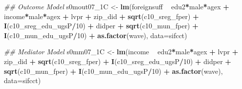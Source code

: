 \documentclass[
]{article}
\newenvironment{Shaded}{\begin{snugshade}}{\end{snugshade}}
\newcommand{\CommentTok}[1]{\textcolor[rgb]{0.56,0.35,0.01}{\textit{#1}}}
\newcommand{\DataTypeTok}[1]{\textcolor[rgb]{0.13,0.29,0.53}{#1}}
\newcommand{\DecValTok}[1]{\textcolor[rgb]{0.00,0.00,0.81}{#1}}
\newcommand{\KeywordTok}[1]{\textcolor[rgb]{0.13,0.29,0.53}{\textbf{#1}}}
\newcommand{\NormalTok}[1]{#1}
\newcommand{\OperatorTok}[1]{\textcolor[rgb]{0.81,0.36,0.00}{\textbf{#1}}}
\newcommand{\StringTok}[1]{\textcolor[rgb]{0.31,0.60,0.02}{#1}}
\begin{document}
\begin{Shaded}
\begin{Highlighting}[]
\CommentTok{## Outcome Model }
\NormalTok{s0mout07_1C <-}\StringTok{ }\KeywordTok{lm}\NormalTok{(foreignsuff  }\OperatorTok{~}\StringTok{ }\NormalTok{edu2}\OperatorTok{*}\NormalTok{male}\OperatorTok{*}\NormalTok{agex }\OperatorTok{+}\StringTok{ }\NormalTok{income}\OperatorTok{*}\NormalTok{male}\OperatorTok{*}\NormalTok{agex }\OperatorTok{+}\StringTok{ }\NormalTok{lvpr }\OperatorTok{+}\StringTok{  }
\StringTok{                    }\NormalTok{zip_did }\OperatorTok{+}\StringTok{ }\KeywordTok{sqrt}\NormalTok{(c10_sreg_fper) }\OperatorTok{+}\StringTok{ }\KeywordTok{I}\NormalTok{(c10_sreg_edu_ugsP}\OperatorTok{/}\DecValTok{10}\NormalTok{) }\OperatorTok{+}\StringTok{ }
\StringTok{                    }\NormalTok{didper }\OperatorTok{+}\StringTok{ }\KeywordTok{sqrt}\NormalTok{(c10_mun_fper) }\OperatorTok{+}\StringTok{ }\KeywordTok{I}\NormalTok{(c10_mun_edu_ugsP}\OperatorTok{/}\DecValTok{10}\NormalTok{) }\OperatorTok{+}\StringTok{ }
\StringTok{                    }\KeywordTok{as.factor}\NormalTok{(wave), }\DataTypeTok{data=}\NormalTok{sifcct)}

\CommentTok{## Mediator Model}
\NormalTok{s0mm07_1C <-}\StringTok{ }\KeywordTok{lm}\NormalTok{(income  }\OperatorTok{~}\StringTok{ }\NormalTok{edu2}\OperatorTok{*}\NormalTok{male}\OperatorTok{*}\NormalTok{agex }\OperatorTok{+}\StringTok{ }\NormalTok{lvpr }\OperatorTok{+}\StringTok{  }
\StringTok{                  }\NormalTok{zip_did }\OperatorTok{+}\StringTok{ }\KeywordTok{sqrt}\NormalTok{(c10_sreg_fper) }\OperatorTok{+}\StringTok{ }\KeywordTok{I}\NormalTok{(c10_sreg_edu_ugsP}\OperatorTok{/}\DecValTok{10}\NormalTok{) }\OperatorTok{+}\StringTok{ }
\StringTok{                  }\NormalTok{didper }\OperatorTok{+}\StringTok{ }\KeywordTok{sqrt}\NormalTok{(c10_mun_fper) }\OperatorTok{+}\StringTok{ }\KeywordTok{I}\NormalTok{(c10_mun_edu_ugsP}\OperatorTok{/}\DecValTok{10}\NormalTok{) }\OperatorTok{+}\StringTok{ }
\StringTok{                  }\KeywordTok{as.factor}\NormalTok{(wave), }\DataTypeTok{data=}\NormalTok{sifcct)}


\end{Highlighting}
\end{Shaded}
\end{document}
